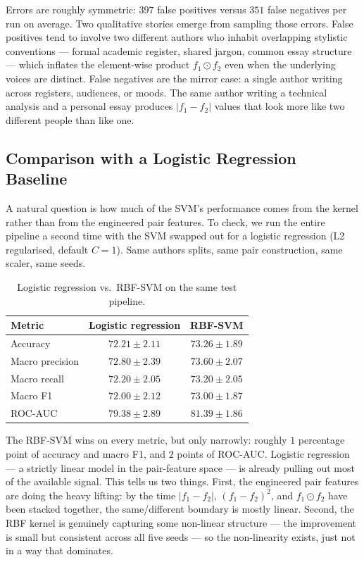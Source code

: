 \documentclass[11pt]{article}
\begin{document}
Errors are roughly symmetric: $397$ false positives versus $351$ false
negatives per run on average. Two qualitative stories emerge from sampling
those errors. False positives tend to involve two different authors who
inhabit overlapping stylistic conventions --- formal academic register, shared
jargon, common essay structure --- which inflates the element-wise product
$f_{1}\odot f_{2}$ even when the underlying voices are distinct. False
negatives are the mirror case: a single author writing across registers,
audiences, or moods. The same author writing a technical analysis and a
personal essay produces $|f_{1}-f_{2}|$ values that look more like two
different people than like one.

\subsection{Comparison with a Logistic Regression Baseline}

A natural question is how much of the SVM's performance comes from the kernel
rather than from the engineered pair features. To check, we run the entire
pipeline a second time with the SVM swapped out for a logistic regression
(L2 regularised, default $C=1$). Same authors splits, same pair construction,
same scaler, same seeds.

\begin{table}[H]
\centering
\small
\caption{Logistic regression vs.\ RBF-SVM on the same test pipeline.}
\label{tab:comparison_lr_svm}
\begin{tabular}{lcc}
\toprule
\textbf{Metric} & \textbf{Logistic regression} & \textbf{RBF-SVM} \\
\midrule
Accuracy        & $72.21 \pm 2.11$ & $73.26 \pm 1.89$ \\
Macro precision & $72.80 \pm 2.39$ & $73.60 \pm 2.07$ \\
Macro recall    & $72.20 \pm 2.05$ & $73.20 \pm 2.05$ \\
Macro F1        & $72.00 \pm 2.12$ & $73.00 \pm 1.87$ \\
ROC-AUC         & $79.38 \pm 2.89$ & $81.39 \pm 1.86$ \\
\bottomrule
\end{tabular}
\end{table}

The RBF-SVM wins on every metric, but only narrowly: roughly $1$ percentage
point of accuracy and macro F1, and $2$ points of ROC-AUC. Logistic
regression --- a strictly linear model in the pair-feature space --- is
already pulling out most of the available signal. This tells us two things.
First, the engineered pair features are doing the heavy lifting: by the time
$|f_{1}-f_{2}|$, $(f_{1}-f_{2})^{2}$, and $f_{1}\odot f_{2}$ have been
stacked together, the same/different boundary is mostly linear. Second, the
RBF kernel is genuinely capturing some non-linear structure --- the
improvement is small but consistent across all five seeds --- so the
non-linearity exists, just not in a way that dominates.
\end{document}
